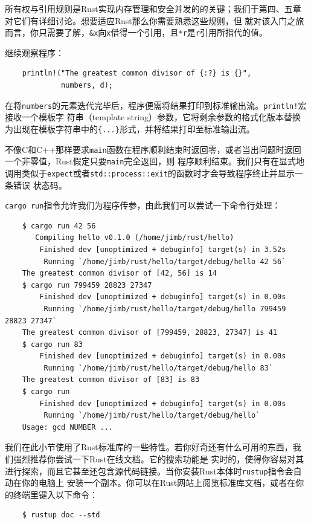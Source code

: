 \medskip
所有权与引用规则是Rust实现内存管理和安全并发的的关键；我们于第四、五章对它们有详细讨论。想要适应Rust那么你需要熟悉这些规则，但
就对该入门之旅而言，你只需要了解，\texttt{\&x}向\texttt{x}借得一个引用，且\texttt{*r}是\texttt{r}引用所指代的值。

\medskip
继续观察程序：
\begin{verbatim}
    println!("The greatest common divisor of {:?} is {}",
             numbers, d);
\end{verbatim}

\smallskip
在将\texttt{numbers}的元素迭代完毕后，程序便需将结果打印到标准输出流。\texttt{println!}宏接收一个模板字
符串（template string）参数，它将剩余参数的格式化版本替换为出现在模板字符串中的\texttt{\{...\}}形式，并将结果打印至标准输出流。

\medskip
不像C和C++那样要求\texttt{main}函数在程序顺利结束时返回零，或者当出问题时返回一个非零值，Rust假定只要\texttt{main}完全返回，则
程序顺利结束。我们只有在显式地调用类似于\texttt{expect}或者\texttt{std::process::exit}的函数时才会导致程序终止并显示一条错误
状态码。

\bigskip
\texttt{cargo run}指令允许我们为程序传参，由此我们可以尝试一下命令行处理：
\begin{verbatim}
    $ cargo run 42 56
       Compiling hello v0.1.0 (/home/jimb/rust/hello)
        Finished dev [unoptimized + debuginfo] target(s) in 3.52s
         Running `/home/jimb/rust/hello/target/debug/hello 42 56`
    The greatest common divisor of [42, 56] is 14
    $ cargo run 799459 28823 27347
        Finished dev [unoptimized + debuginfo] target(s) in 0.00s
         Running `/home/jimb/rust/hello/target/debug/hello 799459 28823 27347`
    The greatest common divisor of [799459, 28823, 27347] is 41
    $ cargo run 83
        Finished dev [unoptimized + debuginfo] target(s) in 0.00s
         Running `/home/jimb/rust/hello/target/debug/hello 83`
    The greatest common divisor of [83] is 83
    $ cargo run
        Finished dev [unoptimized + debuginfo] target(s) in 0.00s
         Running `/home/jimb/rust/hello/target/debug/hello`
    Usage: gcd NUMBER ...
\end{verbatim}

\smallskip
我们在此小节使用了Rust标准库的一些特性。若你好奇还有什么可用的东西，我们强烈推荐你尝试一下Rust在线文档。它的搜索功能是
实时的，使得你容易对其进行探索，而且它甚至还包含源代码链接。当你安装Rust本体时\texttt{rustup}指令会自动在你的电脑上
安装一个副本。你可以在Rust网站上阅览标准库文档，或者在你的终端里键入以下命令：
\begin{verbatim}
    $ rustup doc --std
\end{verbatim}

